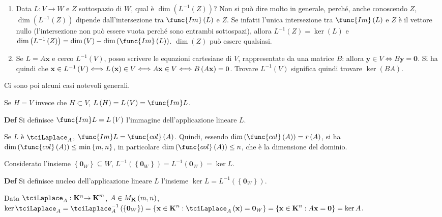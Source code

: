 \documentclass{article}
\begin{document}
\begin{enumerate}
\item Data $L:V\rightarrow W$ e $Z$ sottospazio di $W$, qual \`{e} $\dim
\left( L^{-1}\left( Z\right) \right) $? Non si pu\`{o} dire molto in
generale, perch\'{e}, anche conoscendo $Z$, $\dim \left( L^{-1}\left(
Z\right) \right) $ dipende dall'intersezione tra $\func{Im}\left( L\right) $
e $Z$. Se infatti l'unica intersezione tra $\func{Im}\left( L\right) $ e $Z$ 
\`{e} il vettore nullo (l'intersezione non pu\`{o} essere vuota perch\'{e}
sono entrambi sottospazi), allora $L^{-1}\left( Z\right) =\ker \left(
L\right) $ e $\dim \left( L^{-1}\left( Z\right) \right) =\dim \left(
V\right) -\dim \left( \func{Im}\left( L\right) \right) $. $\dim \left(
Z\right) $ pu\`{o} essere qualsiasi.

\item Se $L=A\mathbf{x}$ e cerco $L^{-1}\left( V\right) $, posso scrivere le
equazioni cartesiane di $V$, rappresentate da una matrice $B$: allora $%
\mathbf{y}\in V\Longleftrightarrow B\mathbf{y=0}$. Si ha quindi che $\mathbf{%
x}\in L^{-1}\left( V\right) \Longleftrightarrow L\left( \mathbf{x}\right)
\in V\Longleftrightarrow A\mathbf{x}\in V\Longleftrightarrow B\left( A%
\mathbf{x}\right) =0$. Trovare $L^{-1}\left( V\right) $ significa quindi
trovare $\ker \left( BA\right) $.
\end{enumerate}

Ci sono poi alcuni casi notevoli generali.

Se $H=V$ invece che $H\subset V$, $L\left( H\right) =L\left( V\right) =\func{%
Im}L$.

\textbf{Def} Si definisce $\func{Im}L=L\left( V\right) $ l'immagine
dell'applicazione lineare $L$.

Se $L$ \`{e} $\tciLaplace _{A}$, $\func{Im}L=\func{col}\left( A\right) $.
Quindi, essendo $\dim \left( \func{col}\left( A\right) \right) =r\left(
A\right) $, si ha $\dim \left( \func{col}\left( A\right) \right) \leq \min
\left\{ m,n\right\} $, in particolare $\dim \left( \func{col}\left( A\right)
\right) \leq n$, che \`{e} la dimensione del dominio.

Considerato l'insieme $\left\{ \mathbf{0}_{W}\right\} \subseteq W$, $%
L^{-1}\left( \left\{ \mathbf{0}_{W}\right\} \right) =L^{-1}\left( \mathbf{0}%
_{W}\right) =\ker L$.

\textbf{Def} Si definisce nucleo dell'applicazione lineare $L$ l'insieme $%
\ker L=L^{-1}\left( \left\{ \mathbf{0}_{W}\right\} \right) $.

Data $\tciLaplace _{A}:\mathbf{K}^{n}\mathbf{\rightarrow K}^{m}$, $A\in M_{%
\mathbf{K}}\left( m,n\right) $, $\ker \tciLaplace _{A}=\tciLaplace
_{A}^{-1}\left( \left\{ \mathbf{0}_{W}\right\} \right) =\left\{ \mathbf{x\in
K}^{n}:\tciLaplace _{A}\left( \mathbf{x}\right) =\mathbf{0}_{W}\right\}
=\left\{ \mathbf{x\in K}^{n}:A\mathbf{x}=\mathbf{0}\right\} =\ker A$.
\end{document}
